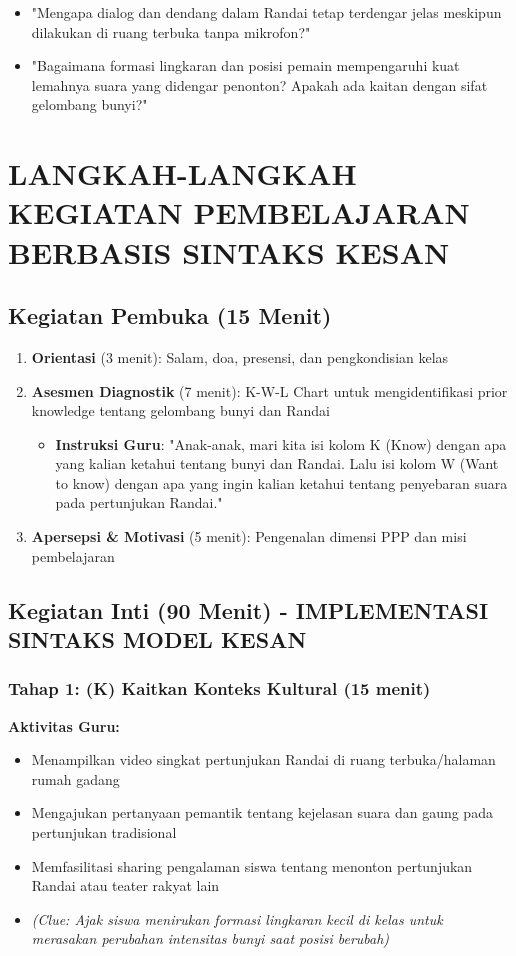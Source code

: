 \documentclass[12pt,a4paper]{article}
\begin{document}
\begin{itemize}
\item "Mengapa dialog dan dendang dalam Randai tetap terdengar jelas meskipun dilakukan di ruang terbuka tanpa mikrofon?"
\item "Bagaimana formasi lingkaran dan posisi pemain mempengaruhi kuat lemahnya suara yang didengar penonton? Apakah ada kaitan dengan sifat gelombang bunyi?"
\end{itemize}

\section{LANGKAH-LANGKAH KEGIATAN PEMBELAJARAN BERBASIS SINTAKS KESAN}

\subsection{Kegiatan Pembuka (15 Menit)}

\begin{enumerate}
\item \textbf{Orientasi} (3 menit): Salam, doa, presensi, dan pengkondisian kelas
\item \textbf{Asesmen Diagnostik} (7 menit): K-W-L Chart untuk mengidentifikasi prior knowledge tentang gelombang bunyi dan Randai
   \begin{itemize}
   \item \textbf{Instruksi Guru}: "Anak-anak, mari kita isi kolom K (Know) dengan apa yang kalian ketahui tentang bunyi dan Randai. Lalu isi kolom W (Want to know) dengan apa yang ingin kalian ketahui tentang penyebaran suara pada pertunjukan Randai."
   \end{itemize}
\item \textbf{Apersepsi \& Motivasi} (5 menit): Pengenalan dimensi PPP dan misi pembelajaran
\end{enumerate}

\subsection{Kegiatan Inti (90 Menit) - IMPLEMENTASI SINTAKS MODEL KESAN}

\subsubsection{Tahap 1: (K) Kaitkan Konteks Kultural (15 menit)}

\textbf{Aktivitas Guru:}
\begin{itemize}
\item Menampilkan video singkat pertunjukan Randai di ruang terbuka/halaman rumah gadang
\item Mengajukan pertanyaan pemantik tentang kejelasan suara dan gaung pada pertunjukan tradisional
\item Memfasilitasi sharing pengalaman siswa tentang menonton pertunjukan Randai atau teater rakyat lain
\item \textit{(Clue: Ajak siswa menirukan formasi lingkaran kecil di kelas untuk merasakan perubahan intensitas bunyi saat posisi berubah)}
\end{itemize}
\end{document}
